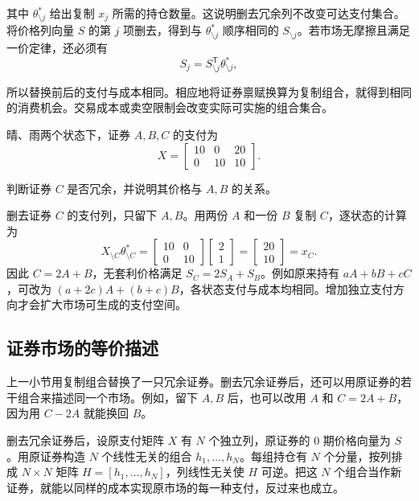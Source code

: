 其中 $\theta^*_{\setminus j}$ 给出复制 $x_j$ 所需的持仓数量。这说明删去冗余列不改变可达支付集合。将价格列向量 $S$ 的第 $j$ 项删去，得到与 $\theta^*_{\setminus j}$ 顺序相同的 $S_{\setminus j}$。若市场无摩擦且满足一价定律，还必须有
\[
 S_j=S_{\setminus j}^{\mathsf T}\theta^*_{\setminus j},
\]

所以替换前后的支付与成本相同。相应地将证券禀赋换算为复制组合，就得到相同的消费机会。交易成本或卖空限制会改变实际可实施的组合集合。

\begin{tcolorbox}[example,title=课堂例题：第三只证券是否增加支付维度]
\begin{question}
晴、雨两个状态下，证券 $A,B,C$ 的支付为
\[
 X=\begin{bmatrix}10&0&20\\0&10&10\end{bmatrix}.
\]

判断证券 $C$ 是否冗余，并说明其价格与 $A,B$ 的关系。
\end{question}
\begin{solution}
删去证券 $C$ 的支付列，只留下 $A,B$。用两份 $A$ 和一份 $B$ 复制 $C$，逐状态的计算为
\[
 X_{\setminus C}\theta^*_{\setminus C}
 =\begin{bmatrix}10&0\\0&10\end{bmatrix}
  \begin{bmatrix}2\\1\end{bmatrix}
 =\begin{bmatrix}20\\10\end{bmatrix}=x_C.
\]
因此 $C=2A+B$，无套利价格满足 $S_C=2S_A+S_B$。例如原来持有 $aA+bB+cC$，可改为 $(a+2c)A+(b+c)B$，各状态支付与成本均相同。增加独立支付方向才会扩大市场可生成的支付空间。
\end{solution}
\end{tcolorbox}

\subsection{证券市场的等价描述}
上一小节用复制组合替换了一只冗余证券。删去冗余证券后，还可以用原证券的若干组合来描述同一个市场。例如，留下 $A,B$ 后，也可以改用 $A$ 和 $C=2A+B$，因为用 $C-2A$ 就能换回 $B$。

\begin{tcolorbox}[knowledge,title=证券市场的等价基底]
删去冗余证券后，设原支付矩阵 $X$ 有 $N$ 个独立列，原证券的 0 期价格向量为 $S$。用原证券构造 $N$ 个线性无关的组合 $h_1,\ldots,h_N$。每组持仓有 $N$ 个分量，按列排成 $N\times N$ 矩阵 $H=[h_1,\ldots,h_N]$，列线性无关使 $H$ 可逆。把这 $N$ 个组合当作新证券，就能以同样的成本实现原市场的每一种支付，反过来也成立。
\end{tcolorbox}

